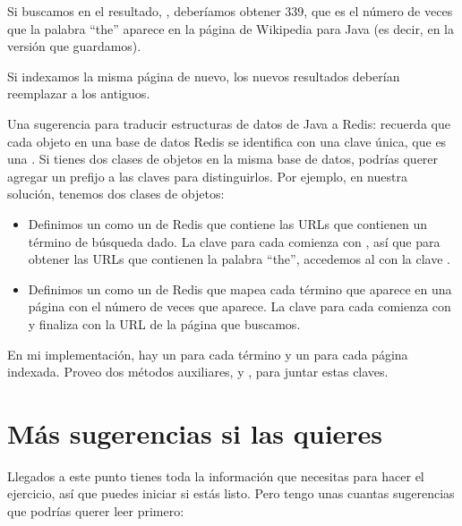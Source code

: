 \documentclass[12pt]{book}
\theoremstyle{exercise}
\begin{document}
Si buscamos  en el resultado, , deberíamos obtener
339, que es el número de veces que la palabra ``the'' aparece en la
página de Wikipedia para Java (es decir, en la versión que guardamos).


Si indexamos la misma página de nuevo, los nuevos resultados deberían
reemplazar a los antiguos.

Una sugerencia para traducir estructuras de datos de Java a Redis:
recuerda que cada objeto en una base de datos Redis se identifica con una
clave única, que es una . Si tienes dos clases de objetos en la
misma base de datos, podrías querer agregar un prefijo a las claves para
distinguirlos. Por ejemplo, en nuestra solución, tenemos dos clases de
objetos:

\begin{itemize}

\item
  Definimos un  como un  de Redis que contiene
  las URLs que contienen un término de búsqueda dado. La clave para cada
   comienza con , así que para obtener las
  URLs que contienen la palabra ``the'', accedemos al  con la
  clave .

\item
  Definimos un  como un  de Redis que mapea
  cada término que aparece en una página con el número de veces que
  aparece. La clave para cada  comienza con
   y finaliza con la URL de la página que buscamos.

\end{itemize}


En mi implementación,  hay un  para cada término y un
 para cada página indexada. Proveo dos métodos
auxiliares,  y , para juntar
estas claves.



\section{Más sugerencias si las quieres}
\label{more-suggestions-if-you-want-them}

Llegados a este punto tienes toda la información que necesitas para hacer el
ejercicio, así que puedes iniciar si estás listo. Pero tengo unas cuantas
sugerencias que podrías querer leer primero:
\end{document}
